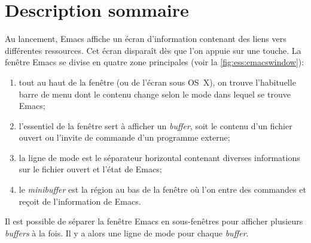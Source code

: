 \section{Description sommaire}
\label{emacs+ess:description}

Au lancement, Emacs affiche un écran d'information contenant des liens
vers différentes ressources. Cet écran disparaît dès que l'on appuie
sur une touche. La fenêtre Emacs se divise en quatre zone principales
(voir la \autoref{fig:ess:emacswindow}):
\begin{enumerate}
\item tout au haut de la fenêtre (ou de l'écran sous OS~X), on trouve
  l'habituelle barre de menu dont le contenu change selon le mode dans
  lequel se trouve Emacs;
\item l'essentiel de la fenêtre sert à afficher un \emph{buffer}, soit
  le contenu d'un fichier ouvert ou l'invite de commande d'un
  programme externe;
\item la ligne de mode est le séparateur horizontal contenant diverses
  informations sur le fichier ouvert et l'état de Emacs;
\item le \emph{minibuffer} est la région au bas de la fenêtre où l'on
  entre des commandes et reçoit de l'information de Emacs.
\end{enumerate}
Il est possible de séparer la fenêtre Emacs en sous-fenêtres pour
afficher plusieurs \emph{buffers} à la fois. Il y a alors une ligne de
mode pour chaque \emph{buffer}.

